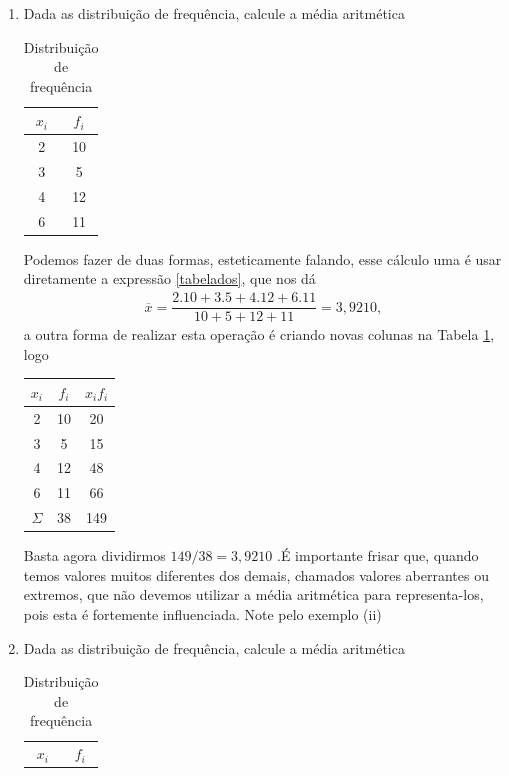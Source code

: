 \noindent \exemplo
\begin{enumerate}
    \item [(i)] Dada as distribuição de frequência, calcule a média aritmética
    \begin{table}[H]
        \caption{Distribuição de frequência }
        \centering
        \label{distri1}
        \begin{tabular}{cc}
        \hline
        $x_i$ & $f_i$ \\
        \hline
        2 & 10 \\
        3 & 5 \\
        4 & 12 \\
        6 & 11 \\
        \hline
    \end{tabular}
\end{table}
\inic Podemos fazer de duas formas, esteticamente falando, esse cálculo uma é usar diretamente a expressão \ref{tabelados}, que nos dá
\begin{align*}
    \overline{x} = \dfrac{2.10 + 3.5 + 4.12+6.11}{10+5+12+11} = 3,9210,
\end{align*}
a outra forma de realizar esta operação é criando novas colunas na Tabela \ref{distri1}, logo
\begin{table}[H]
        \centering
        \label{distri2}
        \begin{tabular}{ccc}
        \hline
        $x_i$ & $f_i$ & $x_if_i$ \\
        \hline
        2 & 10 & 20\\
        3 & 5 & 15\\
        4 & 12 & 48\\
        6 & 11 & 66\\
        \hline
        $\Sigma$ & 38 & 149
    \end{tabular}
\end{table}
\inic Basta agora dividirmos $149/38 = 3,9210$ .É importante frisar que, quando temos valores muitos diferentes dos demais, chamados valores aberrantes ou extremos, que não devemos utilizar a média aritmética para representa-los, pois esta é fortemente influenciada. Note pelo exemplo (ii)
\item [(ii)] Dada as distribuição de frequência, calcule a média aritmética
    \begin{table}[H]
        \caption{Distribuição de frequência }
        \centering
        \label{distri2}
        \begin{tabular}{cc}
        \hline
        $x_i$ & $f_i$ \\

\end{tabular}
\end{table}
\end{enumerate}
